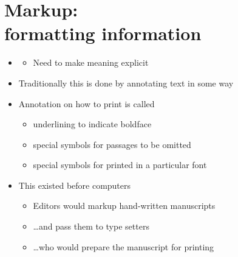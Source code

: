 \documentclass[a4paper,landscape,headrule,footrule,xetex]{foils}
\begin{document}
\section{Markup: \\ formatting information}

\MyLogo{}

\begin{itemize}
\item {}
  \begin{itemize}
  \item Need to make meaning explicit
  \end{itemize}
\item Traditionally this is done by annotating text in some way
\end{itemize}


\begin{itemize}
\item Annotation on how to print is called 
  \begin{itemize}
  \item  underlining to indicate boldface
  \item special symbols for passages to be omitted
  \item special symbols for printed in a particular font
  \end{itemize}
\item This existed before computers
  \begin{itemize}
  \item Editors would markup hand-written manuscripts
  \item \ldots and pass them to type setters
  \item \ldots who would prepare the manuscript for printing
  \end{itemize}
\end{itemize}

\end{document}

